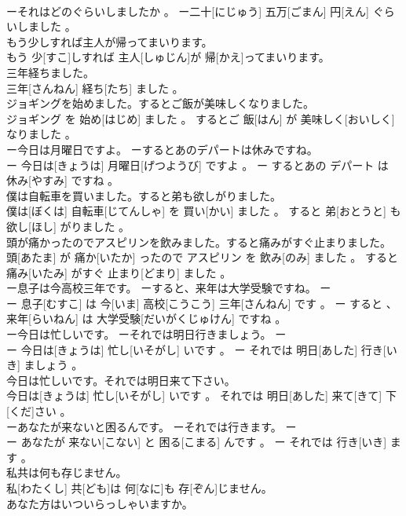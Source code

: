 \documentclass[8pt]{extreport}
\begin{document}
\begin{CJK}{UTF8}{min}
\\	ーそれはどのぐらいしましたか 。 ー二十[にじゅう] 五万[ごまん] 円[えん] ぐらいしました 。
\\	もう少しすれば主人が帰ってまいります。	
\\	もう 少[すこ]しすれば 主人[しゅじん]が 帰[かえ]ってまいります。
\\	三年経ちました。	
\\	三年[さんねん] 経ち[たち] ました 。
\\	ジョギングを始めました。するとご飯が美味しくなりました。	
\\	ジョギング を 始め[はじめ] ました 。 するとご 飯[はん] が 美味しく[おいしく] なりました 。
\\	ー今日は月曜日ですよ。 ーするとあのデパートは休みですね。	
\\	ー 今日は[きょうは] 月曜日[げつようび] ですよ 。 ー するとあの デパート は 休み[やすみ] ですね 。
\\	僕は自転車を買いました。すると弟も欲しがりました。	
\\	僕は[ぼくは] 自転車[じてんしゃ] を 買い[かい] ました 。 すると 弟[おとうと] も 欲し[ほし] がりました 。
\\	頭が痛かったのでアスピリンを飲みました。すると痛みがすぐ止まりました。	
\\	頭[あたま] が 痛か[いたか] ったので アスピリン を 飲み[のみ] ました 。 すると 痛み[いたみ] がすぐ 止まり[どまり] ました 。
\\	ー息子は今高校三年です。 ーすると、来年は大学受験ですね。	ー
\\	ー 息子[むすこ] は 今[いま] 高校[こうこう] 三年[さんねん] です 。 ー すると 、 来年[らいねん] は 大学受験[だいがくじゅけん] ですね 。
\\	ー今日は忙しいです。 ーそれでは明日行きましょう。	ー
\\	ー 今日は[きょうは] 忙し[いそがし] いです 。 ー それでは 明日[あした] 行き[いき] ましょう 。
\\	今日は忙しいです。それでは明日来て下さい。	
\\	今日は[きょうは] 忙し[いそがし] いです 。 それでは 明日[あした] 来て[きて] 下[くだ]さい 。
\\	ーあなたが来ないと困るんです。 ーそれでは行きます。	ー
\\	ー あなたが 来ない[こない] と 困る[こまる] んです 。 ー それでは 行き[いき] ます 。
\\	私共は何も存じません。	
\\	私[わたくし] 共[ども]は 何[なに]も 存[ぞん]じません。
\\	あなた方はいついらっしゃいますか。	

\end{CJK}
\end{document}
